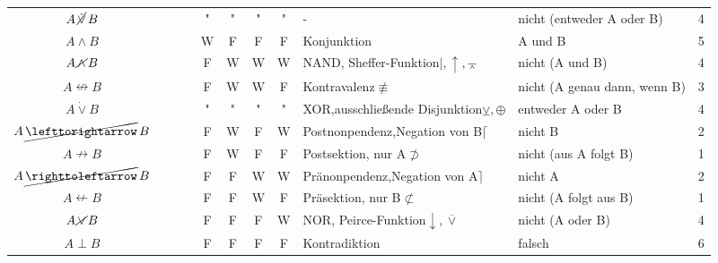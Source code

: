 \documentclass[english,ngerman,parskip=half,headsepline,footsepline]{scrreprt}
\newcommand{\lnxor}{\operatorname{\cancel{\lxor}}}     %
\newcommand{\lleft}{\operatorname{\righttoleftarrow}}  %
\newcommand{\lright}{\operatorname{\lefttorightarrow}} %
\newcommand{\lnand}{\operatorname{\cancel{\land}}}     %
\newcommand{\lnequiv}{\operatorname{\nleftrightarrow}} %
\newcommand{\lxor}{\operatorname{\dot{\lor}}}          %
\newcommand{\lnright}{\operatorname{\cancel{\lright}}} %
\newcommand{\lnimp}{\operatorname{\nrightarrow}}       %
\newcommand{\lnleft}{\operatorname{\cancel{\lleft}}}   %
\newcommand{\lnleftimp}{\operatorname{\nleftarrow}}    %
\newcommand{\lnor}{\operatorname{\cancel{\lor}}}       %
\newcommand{\lbfalse}{\operatorname{\bot}}             %
\begin{document}
\begin{table}
\begin{threeparttable}
\begin{tabularx}{\linewidth}{c||c:cc:cccc|X:X|c|}
			$A\lnxor B$&&&&"&"&"&"&-&nicht (entweder A oder B) &4\\
			\tableline %
			$A\land B$&&&&W&F&F&F&Konjunktion&A und B&5\\
			\tablegroup %
			$A\lnand B$&&&&F&W&W&W&NAND, Sheffer-Funktion\newline$\mid, \uparrow, \barwedge$&nicht (A und B) &4\\
			\tableline %
			$A\lnequiv B$&&&&F&W&W&F&Kontravalenz\newline$\not\equiv$&{\small nicht (A genau dann, wenn B)} &3\\
			\tableline %
			$A\lxor B$&&&&"&"&"&"&XOR,\newline ausschließende Disjunktion\newline$\veebar, \oplus$&entweder A oder B&4\\
			\tableline %
			$A\lnright B$&&&&F&W&F&W&Postnonpendenz,\newline Negation von B\newline$\lceil$&nicht B&2\\
			\tableline %
			$A\lnimp B$&&&&F&W&F&F&Postsektion, nur A\newline$\not\supset$&nicht (aus A folgt B) &1\\
			\tablegroup %
			$A\lnleft B$&&&&F&F&W&W&Pränonpendenz,\newline Negation von A$\rceil$&nicht A&2\\
			\tableline %
			$A\lnleftimp B$&&&&F&F&W&F&Präsektion, nur B\newline$\not\subset$&nicht (A folgt aus B) &1\\
			\tableline %
			$A\lnor B$&&&&F&F&F&W&NOR, Peirce-Funktion\newline$\downarrow, \overline\vee$&nicht (A oder B) &4\\
			\tableline %
			$A\lbfalse B$&&&&F&F&F&F&Kontradiktion&falsch&6\\

\end{tabularx}
\end{threeparttable}
\end{table}
\end{document}
